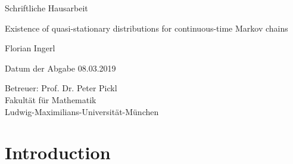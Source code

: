 \documentclass[12pt,a4paper]{scrartcl}
\numberwithin{equation}{section}
\begin{document}
  \pagestyle{empty}

  \begin{titlepage}

    \vspace*{2cm} 

 \begin{center} \large 
    
    Schriftliche Hausarbeit
    \vspace*{2cm}

    {\huge Existence of quasi-stationary distributions for continuous-time Markov chains}
    \vspace*{2.5cm}

    Florian Ingerl
    \vspace*{1.5cm}

    Datum der Abgabe
		08.03.2019
    \vspace*{4.5cm}


    Betreuer: Prof. Dr. Peter Pickl \\[1cm]
    Fakultät für Mathematik \\[1cm]
		Ludwig-Maximilians-Universität-München
  \end{center}
\end{titlepage}


\nocite{*}
  \tableofcontents

\newpage
 


  \pagestyle{headings}


\section{Introduction}
\end{document}
